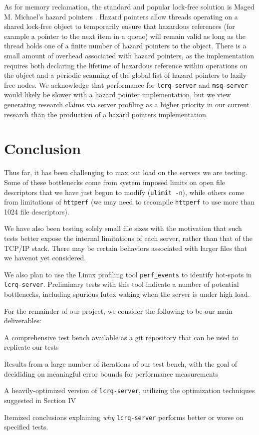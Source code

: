 \documentclass[twoside,10pt]{article}
\begin{document}
\begin{multicols}{2}
As for memory reclamation, the standard and popular lock-free solution
is Maged M. Michael's hazard pointers \cite{michael2004hazard}. Hazard
pointers allow threads operating on a shared lock-free object to
temporarily ensure that hazardous references (for example a pointer to
the next item in a queue) will remain valid as long as the thread
holds one of a finite number of hazard pointers to the object. There
is a small amount of overhead associated with hazard pointers, as the
implementation requires both declaring the lifetime of hazardous
reference within operations on the object and a periodic scanning of
the global list of hazard pointers to lazily free nodes. We
acknowledge that performance for \verb+lcrq-server+ and
\verb+msq-server+ would likely be slower with a hazard pointer
implementation, but we view generating research claims via server
profiling as a higher priority in our current research than the
production of a hazard pointers implementation.

\section{Conclusion}

Thus far, it has been challenging to max out load on the servers we
are testing. Some of these bottlenecks come from system imposed limits
on open file descriptors that we have just begun to modify
(\verb+ulimit -n+), while others come from limitations of
\verb+httperf+ (we may need to recompile \verb+httperf+ to use more
than 1024 file descriptors).

We have also been testing solely small file sizes with the motivation
that such tests better expose the internal limitations of each server,
rather than that of the TCP/IP stack. There may be certain behaviors
associated with larger files that we havenot yet considered.

We also plan to use the Linux profiling tool \verb+perf_events+ to
identify hot-spots in \verb+lcrq-server+. Preliminary tests with this
tool indicate a number of potential bottlenecks, including spurious
futex waking when the server is under high load.

For the remainder of our project, we consider the following to be our
main deliverables:

\begin{compactitem}
\item A comprehensive test bench available as a git repository that
  can be used to replicate our tests
\item Results from a large number of iterations of our test bench,
  with the goal of decididing on meaningful error bounds for
  performance measurements
\item A heavily-optimized version of \verb+lcrq-server+, utilizing the
  optimization techniques suggested in Section IV
\item Itemized conclusions explaining \emph{why} \verb+lcrq-server+
  performs better or worse on specified tests.
\end{compactitem}

\end{multicols}

{\small
  
  
}
\end{document}
